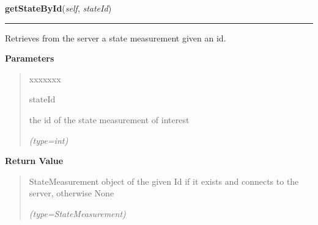 \hspace{.8\funcindent}\begin{boxedminipage}{\funcwidth}

    \raggedright \textbf{getStateById}(\textit{self}, \textit{stateId})

    \vspace{-1.5ex}

    \rule{\textwidth}{0.5\fboxrule}
\setlength{\parskip}{2ex}
    Retrieves from the server a state measurement given an id.

\setlength{\parskip}{1ex}
      \textbf{Parameters}
      \vspace{-1ex}

      \begin{quote}
        \begin{Ventry}{xxxxxxx}

          \item[stateId]

          the id of the state measurement of interest

            {\it (type=int)}

        \end{Ventry}

      \end{quote}

      \textbf{Return Value}
    \vspace{-1ex}

      \begin{quote}
      StateMeasurement object of the given Id if it exists and connects to 
      the server, otherwise None

      {\it (type=StateMeasurement)}

      \end{quote}

    \end{boxedminipage}

